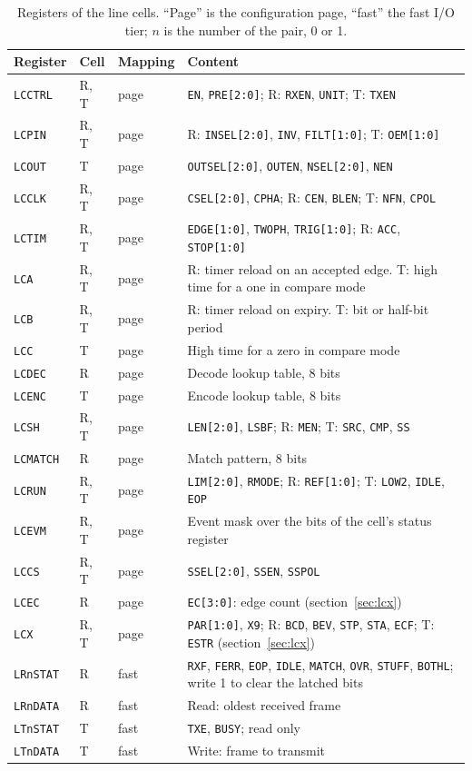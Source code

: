 \documentclass[10pt,a4paper]{article}
\newcommand{\reg}[1]{\texttt{#1}}
\begin{document}
\begin{table}[H]
\centering\small
\begin{tabularx}{\linewidth}{@{}lllL@{}}
\toprule
Register & Cell & Mapping & Content \\
\midrule
\reg{LCCTRL} & R, T & page & \reg{EN}, \reg{PRE[2:0]}; R: \reg{RXEN}, \reg{UNIT}; T: \reg{TXEN} \\
\reg{LCPIN} & R, T & page & R: \reg{INSEL[2:0]}, \reg{INV}, \reg{FILT[1:0]}; T: \reg{OEM[1:0]} \\
\reg{LCOUT} & T & page & \reg{OUTSEL[2:0]}, \reg{OUTEN}, \reg{NSEL[2:0]}, \reg{NEN} \\
\reg{LCCLK} & R, T & page & \reg{CSEL[2:0]}, \reg{CPHA}; R: \reg{CEN}, \reg{BLEN}; T: \reg{NFN}, \reg{CPOL} \\
\reg{LCTIM} & R, T & page & \reg{EDGE[1:0]}, \reg{TWOPH}, \reg{TRIG[1:0]}; R: \reg{ACC}, \reg{STOP[1:0]} \\
\reg{LCA} & R, T & page & R: timer reload on an accepted edge. T: high time for a one in compare mode \\
\reg{LCB} & R, T & page & R: timer reload on expiry. T: bit or half-bit period \\
\reg{LCC} & T & page & High time for a zero in compare mode \\
\reg{LCDEC} & R & page & Decode lookup table, 8 bits \\
\reg{LCENC} & T & page & Encode lookup table, 8 bits \\
\reg{LCSH} & R, T & page & \reg{LEN[2:0]}, \reg{LSBF}; R: \reg{MEN}; T: \reg{SRC}, \reg{CMP}, \reg{SS} \\
\reg{LCMATCH} & R & page & Match pattern, 8 bits \\
\reg{LCRUN} & R, T & page & \reg{LIM[2:0]}, \reg{RMODE}; R: \reg{REF[1:0]}; T: \reg{LOW2}, \reg{IDLE}, \reg{EOP} \\
\reg{LCEVM} & R, T & page & Event mask over the bits of the cell's status register \\
\reg{LCCS} & R, T & page & \reg{SSEL[2:0]}, \reg{SSEN}, \reg{SSPOL} \\
\reg{LCEC} & R & page & \reg{EC[3:0]}: edge count (section~\ref{sec:lcx}) \\
\reg{LCX} & R, T & page & \reg{PAR[1:0]}, \reg{X9}; R: \reg{BCD}, \reg{BEV}, \reg{STP}, \reg{STA}, \reg{ECF}; T: \reg{ESTR} (section~\ref{sec:lcx}) \\
\reg{LRnSTAT} & R & fast & \reg{RXF}, \reg{FERR}, \reg{EOP}, \reg{IDLE}, \reg{MATCH}, \reg{OVR}, \reg{STUFF}, \reg{BOTHL}; write 1 to clear the latched bits \\
\reg{LRnDATA} & R & fast & Read: oldest received frame \\
\reg{LTnSTAT} & T & fast & \reg{TXE}, \reg{BUSY}; read only \\
\reg{LTnDATA} & T & fast & Write: frame to transmit \\
\bottomrule
\end{tabularx}
\caption{Registers of the line cells. ``Page'' is the configuration page, ``fast'' the fast I/O tier; $n$ is the
number of the pair, 0 or 1.}
\end{table}
\end{document}
